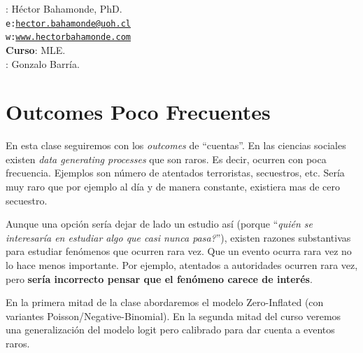 \documentclass[onesided]{article}\usepackage[]{graphicx}\usepackage[]{color}
\begin{document}











\hspace{-5mm}{\bf Profesor}: H\'ector Bahamonde, PhD.\\
\texttt{e:}\href{mailto:hector.bahamonde@uoh.cl}{\texttt{hector.bahamonde@uoh.cl}}\\
\texttt{w:}\href{http://www.hectorbahamonde.com}{\texttt{www.hectorbahamonde.com}}\\
{\bf Curso}: MLE.\\
\hspace{-5mm}{\bf TA}: Gonzalo Barr\'ia.

\section{Outcomes Poco Frecuentes}

En esta clase seguiremos con los \emph{outcomes} de ``cuentas''. En las ciencias sociales existen \emph{data generating processes} que son raros. Es decir, ocurren con poca frecuencia. Ejemplos son n\'umero de atentados terroristas, secuestros, etc. Ser\'ia muy raro que por ejemplo al d\'ia y de manera constante, existiera mas de cero secuestro. 

Aunque una opci\'on ser\'ia dejar de lado un estudio as\'i (porque ``\emph{qui\'en se interesar\'ia en estudiar algo que casi nunca pasa?}''), existen razones substantivas para estudiar fen\'omenos que ocurren rara vez. Que un evento ocurra rara vez no lo hace menos importante. Por ejemplo, atentados a autoridades ocurren rara vez, pero {\bf ser\'ia incorrecto pensar que el fen\'omeno carece de inter\'es}.

En la primera mitad de la clase abordaremos el modelo Zero-Inflated (con variantes Poisson/Negative-Binomial). En la segunda mitad del curso veremos una generalizaci\'on del modelo logit pero calibrado para dar cuenta a eventos raros. 
\end{document}
